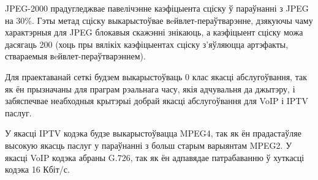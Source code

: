 JPEG-2000 прадугледжвае павелічэнне каэфіцыента сціску ў параўнанні з JPEG на 30\%. Гэты метад сціску выкарыстоўвае вeйвлет-пераўтварэнне, дзякуючы чаму характэрныя для JPEG блокавыя скажэнні знікаюць, а каэфіцыент сціску можа дасягаць 200 (хоць пры вялікіх каэфіцыентах сціску з'яўляюцца артэфакты, ствараемыя вeйвлет-пераўтварэннем).

Для праектаванай сеткі будзем выкарыстоўваць 0 клас якасці абслугоўвання, так як ён прызначаны для праграм рэальнага часу, якія адчувальня да джытэру, і забяспечвае неабходныя крытэрыі добрай якасці абслугоўвання для VoIP і IPTV паслуг.

У якасці IPTV кодэка будзе выкарыстоўвацца MPEG4, так як ён прадастаўляе
высокую якасць паслуг у параўнанні з больш старым варыянтам MPEG2.
У якасці VoIP кодэка абраны G.726, так як ён адпавядае патрабаванню ў
хуткасці кодэка 16 Кбіт/с.
